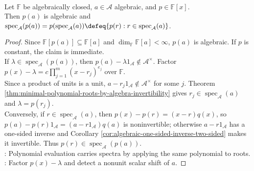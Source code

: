 \begin{theorem} \label{thm:algebra-polynomial-spectral-mapping} \\
Let $\mathbb{F}$ be algebraically closed, $a\in\mathcal{A}$ algebraic, and $p\in\mathbb{F}[x]$.\\
Then $p(a)$ is algebraic and $\operatorname{spec}_{\mathcal{A}}(p(a))=p(\operatorname{spec}_{\mathcal{A}}(a))\defeq\{p(r):r\in\operatorname{spec}_{\mathcal{A}}(a)\}$.
\begin{proof}
Since $\mathbb{F}[p(a)]\subseteq\mathbb{F}[a]$ and $\dim_{\mathbb{F}}\mathbb{F}[a]<\infty$, $p(a)$ is algebraic. If $p$ is constant, the claim is immediate.\\
If $\lambda\in\operatorname{spec}_{\mathcal{A}}(p(a))$, then $p(a)-\lambda1_{\mathcal{A}}\notin\mathcal{A}^{\times}$. Factor $p(x)-\lambda=c\prod_{j=1}^{m}(x-r_j)^{e_j}$ over $\mathbb{F}$.\\
Since a product of units is a unit, $a-r_j1_{\mathcal{A}}\notin\mathcal{A}^{\times}$ for some $j$. Theorem \ref{thm:minimal-polynomial-roots-by-algebra-invertibility} gives $r_j\in\operatorname{spec}_{\mathcal{A}}(a)$ and $\lambda=p(r_j)$.\\
Conversely, if $r\in\operatorname{spec}_{\mathcal{A}}(a)$, then $p(x)-p(r)=(x-r)q(x)$, so $p(a)-p(r)1_{\mathcal{A}}=(a-r1_{\mathcal{A}})q(a)$ is noninvertible; otherwise $a-r1_{\mathcal{A}}$ has a one-sided inverse and Corollary \ref{cor:algebraic-one-sided-inverse-two-sided} makes it invertible. Thus $p(r)\in\operatorname{spec}_{\mathcal{A}}(p(a))$.\\
: Polynomial evaluation carries spectra by applying the same polynomial to roots.\\
: Factor $p(x)-\lambda$ and detect a nonunit scalar shift of $a$.
\end{proof}
\end{theorem}

